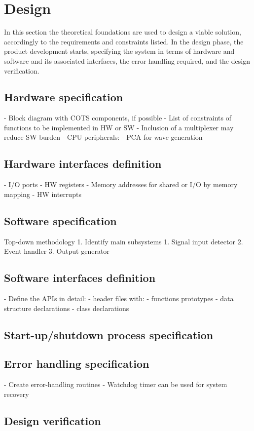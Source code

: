 \chapter{Design}
\label{ch:design}
In this section the theoretical foundations are used to design a viable
solution, accordingly to the requirements and constraints listed.
In the design phase, the product development starts, specifying the system in
terms of hardware and software and its associated interfaces, the error handling
required, and the design verification.
%
  \vspace{-5mm}
%  
\section{Hardware specification}
\label{sec:hw-specs}
- Block diagram with COTS components, if possible
- List of constraints of functions to be implemented in HW or SW
  - Inclusion of a multiplexer may reduce SW burden
  - CPU peripherals:
    - PCA for wave generation
    
\section{Hardware interfaces definition}
\label{sec:hw-interf-def}
- I/O ports
- HW registers
- Memory addresses for shared or I/O by memory mapping
- HW interrupts

\section{Software specification}
\label{sec:sw-specs}
Top-down methodology
1. Identify main subsystems
   1. Signal input detector
   2. Event handler
   3. Output generator

\section{Software interfaces definition}
\label{sec:sw-interf-def}
- Define the APIs in detail:
  - header files with:
    - functions prototypes
    - data structure declarations
    - class declarations

\section{Start-up/shutdown process specification}
\label{sec:startup-shutdown}

\section{Error handling specification}
\label{sec:error-handling-specification}
- Create error-handling routines
- Watchdog timer can be used for system recovery

\section{Design verification}
\label{sec:design-verification}
